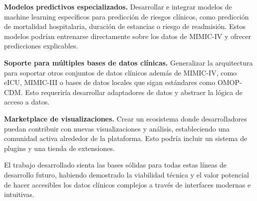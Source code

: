 \textbf{Modelos predictivos especializados.} Desarrollar e integrar modelos de machine learning específicos para predicción de riesgos clínicos, como predicción de mortalidad hospitalaria, duración de estancias o riesgo de readmisión. Estos modelos podrían entrenarse directamente sobre los datos de MIMIC-IV y ofrecer predicciones explicables.






\textbf{Soporte para múltiples bases de datos clínicas.} Generalizar la arquitectura para soportar otros conjuntos de datos clínicos además de MIMIC-IV, como eICU, MIMIC-III o bases de datos locales que sigan estándares como OMOP-CDM. Esto requeriría desarrollar adaptadores de datos y abstraer la lógica de acceso a datos.




\textbf{Marketplace de visualizaciones.} Crear un ecosistema donde desarrolladores puedan contribuir con nuevas visualizaciones y análisis, estableciendo una comunidad activa alrededor de la plataforma. Esto podría incluir un sistema de plugins y una tienda de extensiones.

El trabajo desarrollado sienta las bases sólidas para todas estas líneas de desarrollo futuro, habiendo demostrado la viabilidad técnica y el valor potencial de hacer accesibles los datos clínicos complejos a través de interfaces modernas e intuitivas.

